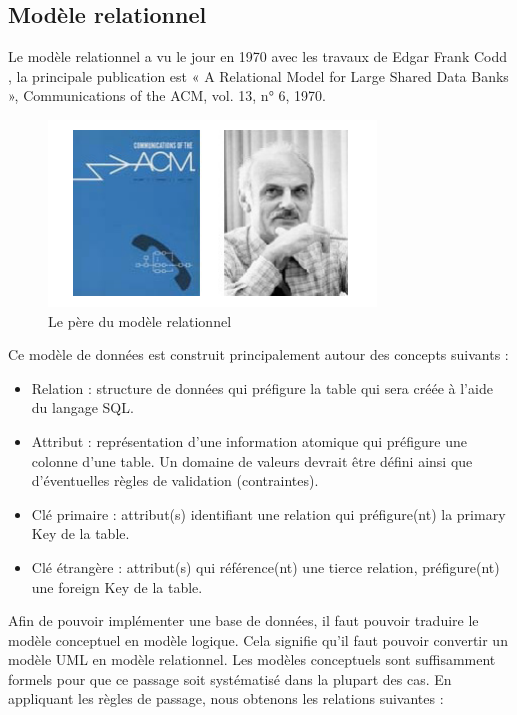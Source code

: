 \begin{itemize}
\section{Modèle relationnel}
Le modèle relationnel a vu le jour en 1970 avec les travaux de Edgar Frank Codd , la principale
publication est « A Relational Model for Large Shared Data Banks », Communications of the
ACM, vol. 13, n° 6, 1970.\\
        \begin{figure}[h!]
                 \centering
                 \includegraphics[scale=1]{images/pere_mr.PNG}
                 \caption{Le père du modèle relationnel}
                 \label{fig48}
        \end{figure}
        
Ce modèle de données est construit principalement autour des concepts suivants \cite{11}:
        \begin{itemize}
            \item[\textbullet] Relation : structure de données qui préfigure la table qui sera créée à l’aide du langage SQL.
            \item[\textbullet]  Attribut  : représentation d’une information atomique qui préfigure une colonne d’une table. Un domaine de valeurs devrait être défini ainsi que d’éventuelles règles de validation (contraintes).
            \item[\textbullet] Clé primaire : attribut(s) identifiant une relation qui préfigure(nt) la primary Key de la table.
            \item[\textbullet] Clé étrangère : attribut(s) qui référence(nt) une tierce relation, préfigure(nt) une foreign Key de la table.             
        \end{itemize}
Afin de pouvoir implémenter une base de données, il faut pouvoir traduire le modèle conceptuel en modèle logique. Cela signifie qu’il faut pouvoir convertir un modèle UML en modèle relationnel. Les modèles conceptuels sont suffisamment formels pour que ce passage soit systématisé dans la plupart des cas. En appliquant les règles de passage\cite{12}, nous obtenons les relations suivantes :


\end{itemize}
